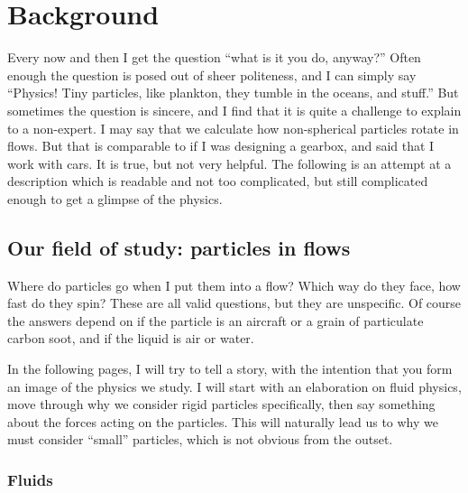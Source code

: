 \documentclass[thesis.tex]{subfiles}
\begin{document}
\chapter{Background}

 Every now and then I get the question ``what is it you do, anyway?'' Often enough the question is posed out of sheer politeness, and I can simply say ``Physics! Tiny particles, like plankton, they tumble in the oceans, and stuff.'' But sometimes the question is sincere, and I find that it is quite a challenge to explain to a non-expert. I may say that we calculate how non-spherical particles rotate in flows. But that is comparable to if I was designing a gearbox, and said that I work with cars. It is true, but not very helpful. The following is an attempt at a description which is readable and not too complicated, but still complicated enough to get a glimpse of the physics.


\section{Our field of study: particles in flows}\label{sec:context}

Where do particles go when I put them into a flow? Which way do they face, how fast do they spin? These are all valid questions, but they are unspecific. Of course the answers depend on if the particle is an aircraft or a grain of particulate carbon soot, and if the liquid is air or water. 

In the following pages, I will try to tell a story, with the intention that you form an image of the physics we study. I will start with an elaboration on fluid physics, move through why we consider rigid particles specifically, then say something about the forces acting on the particles. This will naturally lead us to why we must consider ``small'' particles, which is not obvious from the outset.

\subsection*{Fluids}
\end{document}
